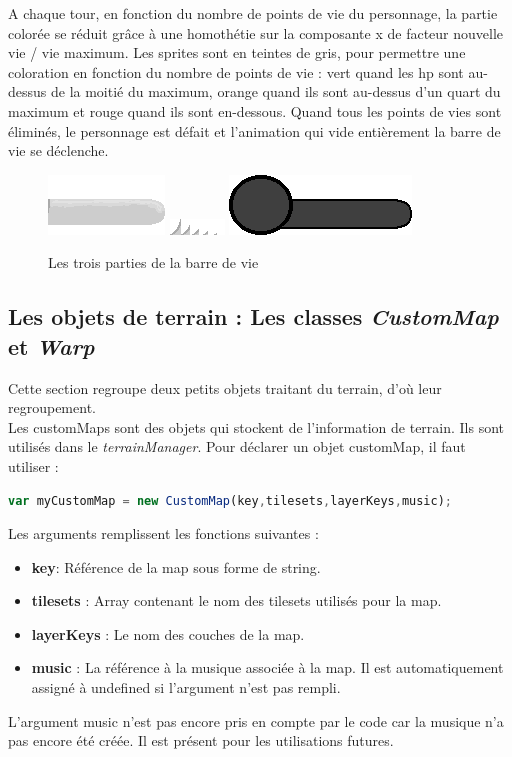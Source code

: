 \documentclass[11pt]{article}
\begin{document}
\begin{appendices}
A chaque tour, en fonction du nombre de points de vie du personnage, la partie colorée se réduit grâce à une homothétie sur la composante x de facteur nouvelle vie / vie maximum.  Les sprites sont en teintes de gris, pour permettre une coloration en fonction du nombre de points de vie : vert quand les hp sont au-dessus de la moitié du maximum, orange quand ils sont au-dessus d'un quart du maximum et rouge quand ils sont en-dessous. Quand tous les points de vies sont éliminés, le personnage est défait et l'animation qui vide entièrement la barre de vie se déclenche.

\begin{figure}[H]
\includegraphics{health}
\includegraphics{healthP2}
\includegraphics{healthBar}
\caption{Les trois parties de la barre de vie}
\end{figure}
\subsection{Les objets de terrain : Les classes \textit{CustomMap} et \textit{Warp}}
Cette section regroupe deux petits objets traitant du terrain, d'où leur regroupement.\\

Les customMaps sont des objets qui stockent de l'information de terrain. Ils sont utilisés dans le \textit{terrainManager}. Pour déclarer un objet customMap, il faut utiliser : 
\begin{lstlisting}[language=JavaScript]
var myCustomMap = new CustomMap(key,tilesets,layerKeys,music);
\end{lstlisting} 

Les arguments remplissent les fonctions suivantes : 
\begin{itemize}
\item \textbf{key}: Référence de la map sous forme de string.
\item \textbf{tilesets} : Array contenant le nom des tilesets utilisés pour la map.
\item \textbf{layerKeys} : Le nom des couches de la map.
\item \textbf{music} : La référence à la musique associée à la map. Il est automatiquement assigné à undefined si l'argument n'est pas rempli.
\end{itemize}
L'argument music n'est pas encore pris en compte par le code car la musique n'a pas encore été créée. Il est présent pour les utilisations futures. \\


\end{appendices}
\end{document}
